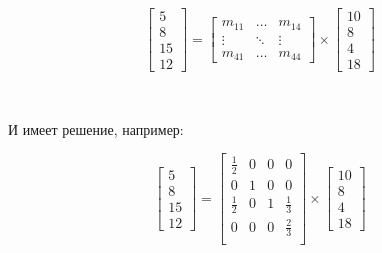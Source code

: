 $$
\left[
\begin{matrix}
	5 \\ 8 \\ 15 \\ 12
\end{matrix}
\right]
=
\left[
\begin{matrix}
	m_{11} & \ldots & m_{14} \\
	\vdots & \ddots & \vdots \\
	m_{41} & \ldots & m_{44}
\end{matrix}
\right]
\times
\left[
\begin{matrix}
	10 \\ 8 \\ 4 \\ 18
\end{matrix}
\right]
$$



\

\noindent И имеет решение, например:

$$
\left[
\begin{matrix}
	5 \\ 8 \\ 15 \\ 12
\end{matrix}
\right]
=
\left[
\begin{matrix}
	\frac12 & 0 & 0 & 0 \\
	0 		& 1 & 0 & 0 \\
	\frac12 & 0 & 1	& \frac13 \\
	0		& 0 & 0 & \frac23 \\
\end{matrix}
\right]
\times
\left[
\begin{matrix}
	10 \\ 8 \\ 4 \\ 18
\end{matrix}
\right]
$$






\vspace{0.5in}


